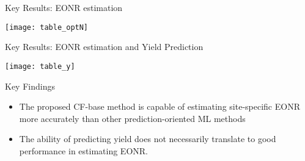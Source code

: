 \documentclass[
  12pt,
  ignorenonframetext,
  aspectratio=169,
]{beamer}
\providecommand{\tightlist}{%
  \setlength{\itemsep}{0pt}\setlength{\parskip}{0pt}}
\begin{document}
\begin{frame}{Key Results: EONR estimation}
\protect\hypertarget{key-results-eonr-estimation}{}
\begin{center}\texttt{[image: table\_optN]} \end{center}
\end{frame}

\begin{frame}{Key Results: EONR estimation and Yield Prediction}
\protect\hypertarget{key-results-eonr-estimation-and-yield-prediction}{}
\begin{center}\texttt{[image: table\_y]} \end{center}
\end{frame}

\begin{frame}{Key Findings}
\protect\hypertarget{key-findings}{}
\begin{block}{}
\protect\hypertarget{section-1}{}
\begin{itemize}
\tightlist
\item
  The proposed CF-base method is capable of estimating site-specific
  EONR more accurately than other prediction-oriented ML methods
  \newline
\item
  The ability of predicting yield does not necessarily translate to good
  performance in estimating EONR.
\end{itemize}
\end{block}
\end{frame}
\end{document}
